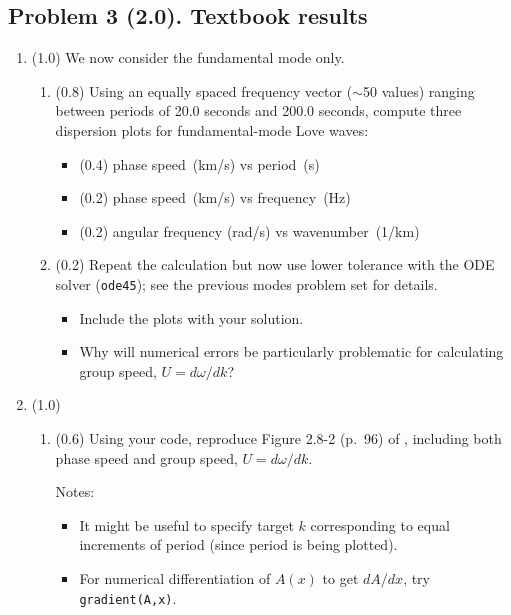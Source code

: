 \documentclass[11pt,titlepage,fleqn]{article}
\begin{document}

\subsection*{Problem 3 (2.0). Textbook results}

\begin{enumerate}

\item (1.0) We now consider the fundamental mode only.

\begin{enumerate}
\item (0.8) Using an equally spaced frequency vector ($\sim$50 values) ranging between periods of 20.0 seconds and 200.0 seconds, compute three dispersion plots for fundamental-mode Love waves:
%
\begin{itemize}
\item (0.4) phase speed~(km/s) vs period~(s)
\item (0.2) phase speed~(km/s) vs frequency~(Hz)
\item (0.2) angular frequency (rad/s) vs wavenumber~(1/km)
\end{itemize}

\item (0.2) Repeat the calculation but now use lower tolerance with the ODE solver (\verb+ode45+); see the previous modes problem set for details.
%
\begin{itemize}
\item Include the plots with your solution.
\item Why will numerical errors be particularly problematic for calculating group speed, $U = d\omega/dk$?
\end{itemize}

\end{enumerate}


\item (1.0)
%
\begin{enumerate}
\item (0.6) Using your code, reproduce Figure 2.8-2 (p.~96) of \citet{SteinWysession}, including both phase speed and group speed, $U = d\omega/dk$.

Notes:
%
\begin{itemize}
\item It might be useful to specify target $k$ corresponding to equal increments of period (since period is being plotted).
\item For numerical differentiation of $A(x)$ to get $dA/dx$, try \verb+gradient(A,x)+.
\end{itemize}


\end{enumerate}
\end{enumerate}
\end{document}
